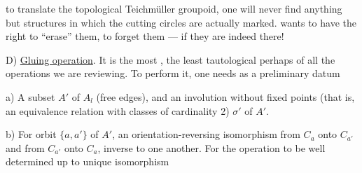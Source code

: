 to  translate the topological Teichmüller groupoid, one will never find anything but structures in which the cutting circles are actually marked.
 wants to have the right to ``erase'' them, to forget them  ---  if they are indeed there!

D) \uline{Gluing operation}. It is the most , the least tautological perhaps of all the operations we are reviewing.
To perform it, one needs as a preliminary datum

a) A subset  $A'$ of $A_l$ (free edges), and an involution without fixed points (that is, an equivalence relation with classes of cardinality 2) $\sigma'$ of  $A'$.

b) For   orbit  $\{a,a'\}$ of $A'$, an orientation-reversing isomorphism from $C_a$ onto $C_{a'}$ and from $C_{a'}$ onto $C_a$, inverse to one another.
For the operation to be well determined up to unique isomorphism
